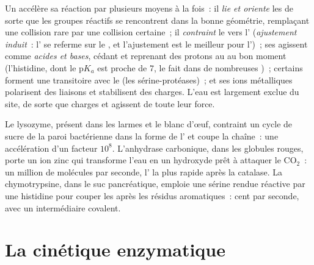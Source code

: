 \begin{proposition}\label{prop:b1:enzymes:mechanisms}
Un  accélère sa réaction par plusieurs moyens à la fois~: il
\emph{lie et oriente} les  de sorte que les groupes réactifs se
rencontrent dans la bonne géométrie, remplaçant une collision rare par
une collision certaine~; il \emph{contraint} le  vers l' (\emph{ajustement induit}~: l'
se referme sur le , et l'ajustement est le meilleur pour l')~; ses  agissent comme \emph{acides et
bases}, cédant et reprenant des protons au  au bon moment
(l'histidine, dont le p$K_a$ est proche de 7, le fait dans de nombreuses
)~; certains forment une \emph{} transitoire
avec le  (les sérine-protéases)~; et ses ions métalliques
polarisent des liaisons et stabilisent des charges. L'eau est largement
exclue du site, de sorte que charges et  agissent de
toute leur force.
\end{proposition}

\begin{example}\label{ex:b1:enzymes:three}
Le lysozyme, présent dans les larmes et le blanc d'œuf, contraint un
cycle de sucre de la paroi bactérienne dans la forme de l' et coupe la chaîne~: une accélération d'un facteur $10^8$.
L'anhydrase carbonique, dans les globules rouges, porte un ion zinc qui
transforme l'eau en un hydroxyde prêt à attaquer le $\mathrm{CO_2}$~: un
million de molécules par seconde, l' la plus rapide après la
catalase. La chymotrypsine, dans le suc pancréatique, emploie une
sérine rendue réactive par une histidine pour couper les  après
les résidus aromatiques~: cent par seconde, avec un intermédiaire
covalent.
\end{example}

\section{La cinétique enzymatique}

